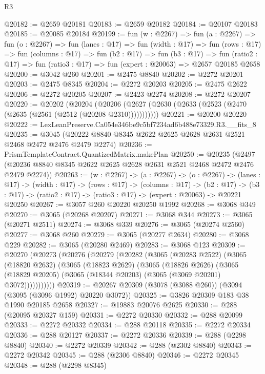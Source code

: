 \begin{lexlean}{R3}
\begin{coremodule}
@20182 := @2659 @20181
@20183 := @2659 @20182
@20184 := @20107 @20183
@20185 := @20085 @20184
@20199 := fun (w : @2267) =>
  fun (a : @2267) =>
  fun (o : @2267) =>
  fun (lanes : @17) =>
  fun (width : @17) =>
  fun (rows : @17) =>
  fun (columns : @17) =>
  fun (b2 : @17) =>
  fun (b3 : @17) =>
  fun (ratio2 : @17) => fun (ratio3 : @17) => fun (expert : @20063) => @2657 @20185 @2658
@20200 := @3042 @260
@20201 := @2475 @8840
@20202 := @2272 @20201
@20203 := @2475 @8345
@20204 := @2272 @20203
@20205 := @2475 @2622
@20206 := @2272 @20205
@20207 := @2423 @2274
@20208 := @2272 @20207
@20220 := @20202
    (@20204 (@20206 (@2627 (@2630 (@2633 (@2523 (@2470 (@2635 (@2561 (@2512 (@20208 @2310)))))))))))
@20221 := @20200 @20220
@20222 := LexLeanPreserve.Ca054e346be9c5bf7234ad6b488e73329.R3.__fits_8
@20235 := @3045 (@20222 @8840 @8345 @2622 @2625 @2628 @2631 @2521 @2468 @2472 @2476 @2479 @2274)
@20236 := PrismTemplateContract.QuantizedMatrix.makePlan
@20250 := @20235
    (@2497 (@20236 @8840 @8345 @2622 @2625 @2628 @2631 @2521 @2468 @2472 @2476 @2479 @2274))
@20263 := (w : @2267) ->
  (a : @2267) ->
  (o : @2267) ->
  (lanes : @17) ->
  (width : @17) ->
  (rows : @17) ->
  (columns : @17) ->
  (b2 : @17) -> (b3 : @17) -> (ratio2 : @17) -> (ratio3 : @17) -> (expert : @20063) -> @20221 @20250
@20267 := @3057 @260 @20220 @20250 @1992
@20268 := @3068 @349
@20270 := @3065 (@20268 @20207)
@20271 := @3068 @344
@20273 := @3065 (@20271 @2511)
@20274 := @3068 @339
@20276 := @3065 (@20274 @2560)
@20277 := @3068 @260
@20279 := @3065 (@20277 @2634)
@20280 := @3068 @229
@20282 := @3065 (@20280 @2469)
@20283 := @3068 @123
@20309 := @20270
    (@20273
      (@20276
        (@20279
          (@20282
            (@3065
              (@20283 @2522)
              (@3065
                (@18820 @2632)
                (@3065
                  (@18823 @2629)
                  (@3065
                    (@18826 @2626)
                    (@3065
                      (@18829 @20205)
                      (@3065 (@18344 @20203) (@3065 (@3069 @20201) @3072)))))))))))
@20319 := @20267 @20309 (@3078 (@3088 @260)) (@3094 (@3095 (@3096 @1992) @20220 @3072))
@20325 := @3826 @20309 @183 @38 @1990 @20185 @2658
@20327 := @19883 @20076 @2625
@20330 := @288 (@20095 @20327 @159)
@20331 := @2272 @20330
@20332 := @288 @20099
@20333 := @2272 @20332
@20334 := @288 @20118
@20335 := @2272 @20334
@20336 := @288 @20127
@20337 := @2272 @20336
@20339 := @288 (@2298 @8840)
@20340 := @2272 @20339
@20342 := @288 (@2302 @8840)
@20343 := @2272 @20342
@20345 := @288 (@2306 @8840)
@20346 := @2272 @20345
@20348 := @288 (@2298 @8345)

\end{coremodule}
\end{lexlean}
